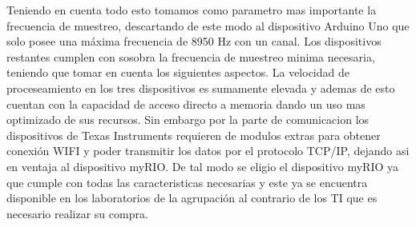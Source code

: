 \par Teniendo en cuenta todo esto tomamos como parametro mas importante la frecuencia de
muestreo, descartando de este modo al dispositivo Arduino Uno que solo posee una
máxima frecuencia de 8950 Hz con un canal. Los dispositivos restantes cumplen con
sosobra la frecuencia de muestreo minima necesaria, teniendo que tomar en cuenta los
siguientes aspectos. La velocidad de proceseamiento en los tres dispositivos es
sumamente elevada y ademas de esto cuentan con la capacidad de acceso directo a
memoria dando un uso mas optimizado de sus recursos. Sin embargo por la parte de
comunicacion los dispositivos de Texas Instruments requieren de modulos extras
para obtener conexión WIFI y poder transmitir los datos por el protocolo TCP/IP,
dejando asi en ventaja al dispositivo myRIO. De tal modo se eligio el dispositivo
myRIO ya que cumple con todas las caracteristicas necesarias y este ya se encuentra
disponible en los laboratorios de la agrupación al contrario de los TI que es necesario
realizar su compra.
